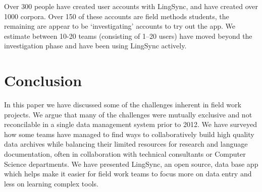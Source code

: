 \documentclass[letterpaper, 12pt, dvips]{mitwpl}
\begin{document}

Over 300 people have created user accounts with LingSync,
and have created over 1000 corpora.
Over 150 of these accounts are field methods students, the remaining are appear to be `investigating' accounts to try out the app.
We estimate between 10-20 teams (consisting of 1--20 users) have moved beyond the investigation phase and have been using LingSync actively.

\section{Conclusion } 
\label{sec:conclusion}

In this paper we have discussed some of the challenges inherent in field work projects. 
We argue that many of the challenges were mutually exclusive and not reconcilable in a single data management system prior to 2012. 
We have surveyed how some teams have managed to find ways to collaboratively build high quality data archives while balancing  their limited resources for research and language documentation, often in collaboration with technical consultants or Computer Science departments. 
We have presented LingSync, an open source, data base app which helps make it easier for field work teams to focus more on data entry and less on learning complex tools.






\custombib{}
\end{document}
